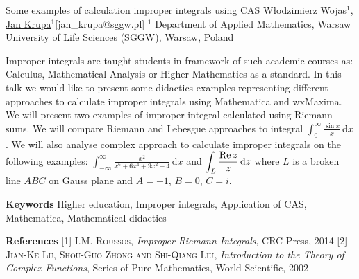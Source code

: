


\begin{abstract_online}{Some examples of calculation improper integrals using CAS}{%
        \underline{W{\l}odzimierz Wojas}$^{1}$, \underline{Jan Krupa}$^{1}$}{[jan\_krupa@sggw.pl]
        }{%
        $^1$ Department of Applied Mathematics, Warsaw University of Life Sciences (SGGW), Warsaw, Poland}


\newcommand{\ds}{\displaystyle}
\newcommand{\dx}{\,\mathrm{d}}


Improper integrals are taught students in framework of such academic courses as: Calculus, Mathematical Analysis or Higher Mathematics as a standard. In this talk we would like to present some didactics examples representing different approaches to calculate improper integrals using Mathematica and wxMaxima. We will present two examples of improper integral calculated using Riemann sums. We will compare Riemann and Lebesgue approaches to integral  $\ds \int_0^{\infty}\frac{\sin x}{x}\dx{x}$. We will also analyse complex approach to calculate improper integrals on the following examples: $\ds \int_{-\infty}^{\infty}\frac{x^2}{x^6+6x^4+9x^2+4}\dx{x}$   and $\ds \int_L\frac{\re z}{\bar{z}}\dx{z}$ where $L$  is a broken line $ABC$  on Gauss plane and $A=-1$, $B=0$, $C=i$.


\textbf{Keywords} \newline{} Higher education, Improper integrals, Application of CAS, Mathematica, Mathematical didactics




\textbf{References}\newline{}
[1] \textsc{I.M. Roussos}, \emph{Improper Riemann Integrals}, CRC Press, 2014\newline{}
[2] \textsc{Jian-Ke Lu, Shou-Guo Zhong and Shi-Qiang Liu}, \emph{Introduction to the Theory of Complex Functions}, Series of Pure Mathematics, World Scientific, 2002
\end{abstract_online}